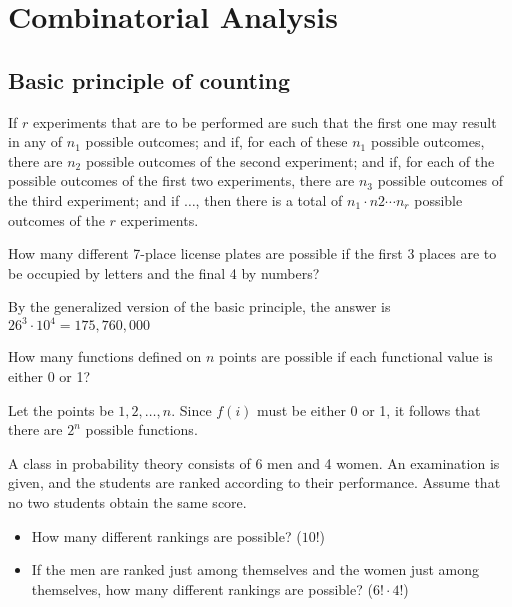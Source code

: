 \chapter{Combinatorial Analysis}

\section{Basic principle of counting}

\begin{mdframed}
  If $r$ experiments that are to be performed are such that the first one may result in any of $n_1$ possible outcomes; and if, for each of these $n_1$ possible outcomes, there are $n_2$ possible outcomes of the second experiment; and if, for each of the possible outcomes of the first two experiments, there are $n_3$ possible outcomes of the third experiment; and if $\ldots$, then there is a total of $n_1 \cdot n2 \cdots n_r$ possible outcomes of the $r$ experiments.
\end{mdframed}

\begin{example}
  How many different 7-place license plates are possible if the first 3 places are to be occupied by letters and the final 4 by numbers?

  By the generalized version of the basic principle, the answer is $26^3 \cdot 10^4 = 175,760,000$
\end{example}

\begin{example}
  How many functions defined on $n$ points are possible if each functional value is either 0 or 1?
  
  Let the points be $1, 2, \ldots, n$. Since $f(i)$ must be either 0 or 1, it follows that there are $2^n$ possible functions.
\end{example}

\begin{example}
  A class in probability theory consists of 6 men and 4 women. An examination is given, and the students are ranked according to their performance. Assume that no two students obtain the same score.

  \begin{itemize}
    \item How many different rankings are possible? \hfill{($10!$)}
    \item If the men are ranked just among themselves and the women just among themselves, how many different rankings are possible? \hfill{($6! \cdot 4!$)}
  \end{itemize}
\end{example}

